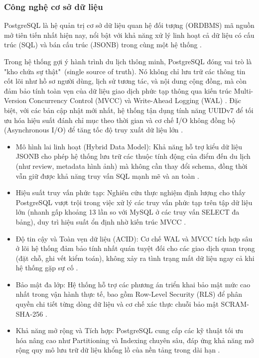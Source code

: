 \subsubsection{Công nghệ cơ sở dữ liệu}


PostgreSQL là hệ quản trị cơ sở dữ liệu quan hệ đối tượng (ORDBMS) mã nguồn mở tiên tiến nhất hiện nay, nổi bật với khả năng xử lý linh hoạt cả dữ liệu có cấu trúc (SQL) và bán cấu trúc (JSONB) trong cùng một hệ thống \cite{schonig2024}. 

Trong hệ thống gợi ý hành trình du lịch thông minh, PostgreSQL đóng vai trò là "kho chứa sự thật"\ (single source of truth). Nó không chỉ lưu trữ các thông tin cốt lõi như hồ sơ người dùng, lịch sử tương tác, và nội dung cộng đồng, mà còn đảm bảo tính toàn vẹn của dữ liệu giao dịch phức tạp thông qua kiến trúc Multi-Version Concurrency Control (MVCC) và Write-Ahead Logging (WAL) \cite{postgres17_manual}. Đặc biệt, với các bản cập nhật mới nhất, hệ thống tận dụng tính năng UUIDv7 để tối ưu hóa hiệu suất đánh chỉ mục theo thời gian và cơ chế I/O không đồng bộ (Asynchronous I/O) để tăng tốc độ truy xuất dữ liệu lớn \cite{postgres18_docs}.

\begin{itemize}
    \item Mô hình lai linh hoạt (Hybrid Data Model): 
    Khả năng hỗ trợ kiểu dữ liệu JSONB cho phép hệ thống lưu trữ các thuộc tính động của điểm đến du lịch (như review, metadata hình ảnh) mà không cần thay đổi schema, đồng thời vẫn giữ được khả năng truy vấn SQL mạnh mẽ và an toàn \cite{schonig2024}.

    \item Hiệu suất truy vấn phức tạp: 
    Nghiên cứu thực nghiệm định lượng cho thấy PostgreSQL vượt trội trong việc xử lý các truy vấn phức tạp trên tập dữ liệu lớn (nhanh gấp khoảng 13 lần so với MySQL ở các truy vấn SELECT đa bảng), duy trì hiệu suất ổn định nhờ kiến trúc MVCC \cite{uddin2024_benchmark}.

    \item Độ tin cậy và Toàn vẹn dữ liệu (ACID): 
    Cơ chế WAL và MVCC tích hợp sâu ở lõi hệ thống đảm bảo tính nhất quán tuyệt đối cho các giao dịch quan trọng (đặt chỗ, ghi vết kiểm toán), không xảy ra tình trạng mất dữ liệu ngay cả khi hệ thống gặp sự cố \cite{postgres17_manual}.

    \item Bảo mật đa lớp: 
    Hệ thống hỗ trợ các phương án triển khai bảo mật mức cao nhất trong vận hành thực tế, bao gồm Row-Level Security (RLS) để phân quyền chi tiết từng dòng dữ liệu và cơ chế xác thực chuỗi bảo mật SCRAM-SHA-256 \cite{chan2025_dba}.

    \item Khả năng mở rộng và Tích hợp: 
    PostgreSQL cung cấp các kỹ thuật tối ưu hóa nâng cao như Partitioning và Indexing chuyên sâu, đáp ứng khả năng mở rộng quy mô lưu trữ dữ liệu khổng lồ của nền tảng trong dài hạn \cite{schonig2024}.
\end{itemize}

